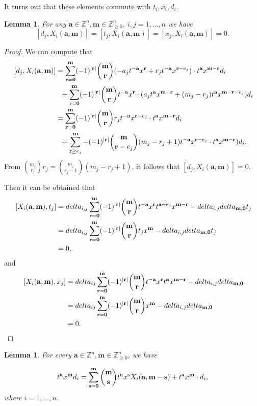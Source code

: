 \documentclass[12pt,a4paper]{amsart}
\def\delta{delta}%
\newtheorem{lemma}[theorem]{Lemma}%
\numberwithin{equation}{section}
\newcommand{\Z}{\mathbb{Z}}
\def\ba{\mathbf{a}}
\def\br{\mathbf{r}}
\def\bs{\mathbf{s}}
\def\bm{\mathbf{m}}
\def\bo{\mathbf{0}}
\begin{document}
 It turns out that these elements commute with
$t_i, x_i,d_i$.


 \begin{lemma}\label{D-L} For any $\ba\in \Z^n, \bm\in\Z_{\geq 0}^n$, $i,j=1,\dots,n$  we have
 $$[d_j,X_i(\ba,\bm)]=[t_j,X_i(\ba,\bm)]=[x_j,X_i(\ba,\bm)]=0.$$
\end{lemma}

\begin{proof}
We can compute that $$\aligned\
 [d_j, X_i(\ba,\bm)]
&= \sum_{\br=\bo}^{\bm} (-1)^{|\br|}\binom{\bm}{\br}
(-a_jt^{-\ba}x^{\br}+r_jt^{-\ba}x^{\br-e_j})\cdot t^{\ba}x^{\bm-\br}d_{i}\\
& \ \ +\sum_{\br=\bo}^{\bm} (-1)^{|\br|}\binom{\bm}{\br}t^{-\ba}x^{\br}\cdot (a_jt^{\ba}x^{\bm-\br}+(m_j-r_j)t^{\ba}x^{\bm-\br-e_j})d_{i}\\
&= \sum_{\br=\bo}^{\bm} (-1)^{|\br|}\binom{\bm}{\br}
r_jt^{-\ba}x^{\br-e_j}\cdot t^{\ba}x^{\bm-\br}d_{i}\\
& \ \ +\sum_{\br\geq e_j}^{\bm} -(-1)^{|\br|}\binom{\bm}{\br-e_j}(m_j-r_j+1)t^{-\ba}x^{\br-e_j}\cdot t^{\ba}x^{\bm-\br})d_{i}.
\endaligned$$
From $\binom{m_j}{r_j}
r_j=\binom{m_j}{r_j-1}(m_j-r_j+1)$, it follows that
 $[d_j, X_i(\ba,\bm)]=0$.

Then it can be obtained that  $$\aligned\
 [X_i(\ba,\bm),t_j]
&= \delta_{i,j}\sum_{\br=\bo}^{\bm} (-1)^{|\br|}\binom{\bm}{\br}t^{-\ba}x^{\br} t^{\ba+e_j}x^{\bm-\br}
 -\delta_{i,j}\delta_{\bm,\bo}t_j\\
&= \delta_{i,j}\sum_{\br=\bo}^{\bm} (-1)^{|\br|}\binom{\bm}{\br}t_jx^{\bm}
 -\delta_{i,j}\delta_{\bm,\bo}t_j\\
&=0,
 \endaligned$$
and  $$\aligned\
 [X_i(\ba,\bm),x_j]
&= \delta_{ij}\sum_{\br=\bo}^{\bm} (-1)^{|\br|}\binom{\bm}{\br}t^{-\ba}x^{\br} t^{\ba}x^{\bm-\br}
 -\delta_{i,j}\delta_{\bm,\bo}\\
&= \delta_{ij}\sum_{\br=\bo}^{\bm} (-1)^{|\br|}\binom{\bm}{\br} x^{\bm}
 -\delta_{i,j}\delta_{\bm,\bo}\\
&=0.
 \endaligned$$
\end{proof}

\begin{lemma}\label{dx}For every $\ba\in \Z^n, \bm\in\Z_{\geq 0}^n$, we have

\begin{equation}\label{X}\aligned
 t^{\ba}x^{\bm}d_{i}=\sum_{\bs=\bo}^{\bm} \binom{\bm}{\bs}t^{\ba}x^{\bs}X_i(\ba,\bm-\bs)
 +t^{\ba}x^{\bm}\cdot d_{i},
 \endaligned\end{equation}
where $i=1,\dots,n$.
\end{lemma}
\end{document}
